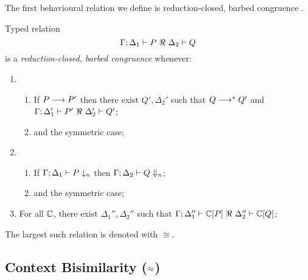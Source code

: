 \noi The first behavioural relation we define is reduction-closed, barbed congruence \cite{HondaKYoshida95}. 

\begin{definition}
\label{def:rc}
	Typed relation
	\[
		\horel{\Gamma}{\Delta_1}{P}{\ \Re\ }{\Delta_2}{Q}
	\]
	is a {\em reduction-closed, barbed congruence} whenever:
%
	\begin{enumerate}[1)]
		\item
				\begin{enumerate}
					\item	If $P \longrightarrow P'$ then there exist $Q', \Delta_2'$ such that $Q \longrightarrow^* Q'$ and\\
							$\horel{\Gamma}{\Delta_1'}{P'}{\ \Re\ }{\Delta_2'}{Q'}$;
					\item	and the symmetric case;
				\end{enumerate}
		\item
				\begin{enumerate}
					\item	If $\Gamma;\Delta_1 \vdash P \downarrow_{n}$ then $\Gamma;\Delta_2 \vdash Q \Downarrow_{n}$;
					\item	and the symmetric case;
				\end{enumerate}

		\item	For all ${\mathbb{C}}$, there exist $\Delta_1'',\Delta_2''$ such that
				$\horel{\Gamma}{\Delta_1''}{\context{\C}{P}}{\ \Re\ }{\Delta_2''}{\context{\C}{Q}}$; 
	\end{enumerate}
	The largest such relation is denoted with $\cong$.
\end{definition}

\subsection{Context Bisimilarity ($\approx$)}
\label{subsec:bisimulation}

